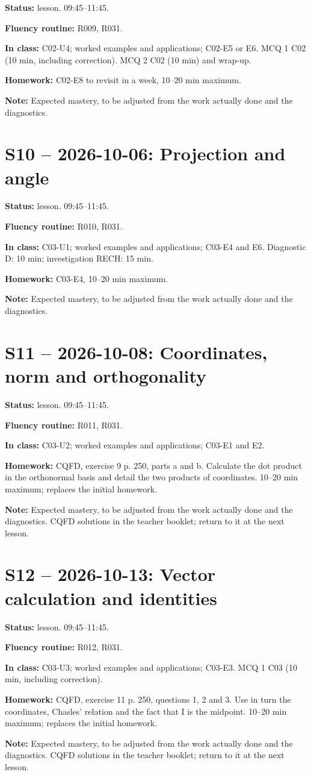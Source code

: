 \textbf{Status:} lesson. 09:45–11:45.\par\textbf{Fluency routine:} R009, R031.\par\textbf{In class:} C02-U4; worked examples and applications; C02-E5 or E6.  MCQ 1 C02 (10 min, including correction). MCQ 2 C02 (10 min) and wrap-up.\par\textbf{Homework:} C02-E8 to revisit in a week, 10–20 min maximum.\par\textbf{Note:} Expected mastery, to be adjusted from the work actually done and the diagnostics.
\section*{S10 -- 2026-10-06: Projection and angle}
\textbf{Status:} lesson. 09:45–11:45.\par\textbf{Fluency routine:} R010, R031.\par\textbf{In class:} C03-U1; worked examples and applications; C03-E4 and E6. Diagnostic D: 10 min; investigation RECH: 15 min.\par\textbf{Homework:} C03-E4, 10–20 min maximum.\par\textbf{Note:} Expected mastery, to be adjusted from the work actually done and the diagnostics.
\section*{S11 -- 2026-10-08: Coordinates, norm and orthogonality}
\textbf{Status:} lesson. 09:45–11:45.\par\textbf{Fluency routine:} R011, R031.\par\textbf{In class:} C03-U2; worked examples and applications; C03-E1 and E2. \par\textbf{Homework:} CQFD, exercise 9 p. 250, parts a and b. Calculate the dot product in the orthonormal basis and detail the two products of coordinates. 10–20 min maximum; replaces the initial homework.\par\textbf{Note:} Expected mastery, to be adjusted from the work actually done and the diagnostics. CQFD solutions in the teacher booklet; return to it at the next lesson.
\section*{S12 -- 2026-10-13: Vector calculation and identities}
\textbf{Status:} lesson. 09:45–11:45.\par\textbf{Fluency routine:} R012, R031.\par\textbf{In class:} C03-U3; worked examples and applications; C03-E3.  MCQ 1 C03 (10 min, including correction).\par\textbf{Homework:} CQFD, exercise 11 p. 250, questions 1, 2 and 3. Use in turn the coordinates, Chasles' relation and the fact that I is the midpoint. 10–20 min maximum; replaces the initial homework.\par\textbf{Note:} Expected mastery, to be adjusted from the work actually done and the diagnostics. CQFD solutions in the teacher booklet; return to it at the next lesson.
